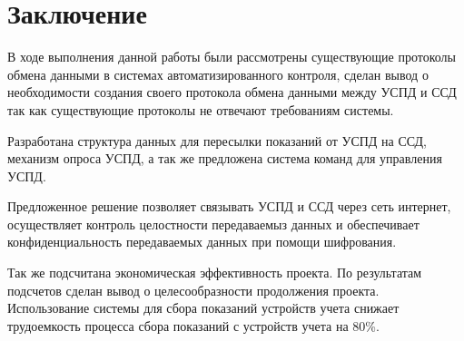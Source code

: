 \newpage
\section{Заключение}
\setcounter{figure}{0}

В ходе выполнения данной работы были рассмотрены существующие протоколы обмена данными в системах автоматизированного контроля, сделан вывод о необходимости создания своего протокола обмена данными между УСПД и ССД так как существующие протоколы не отвечают требованиям системы. 

Разработана структура данных для пересылки показаний от УСПД на ССД, механизм опроса УСПД, а так же предложена система команд для управления УСПД.


Предложенное решение позволяет связывать УСПД и ССД через сеть интернет, осуществляет контроль целостности передаваемыз данных и обеспечивает конфиденциальность передаваемых данных при помощи шифрования.

Так же подсчитана экономическая эффективность проекта. По результатам подсчетов сделан вывод о целесообразности продолжения проекта. Использование системы для сбора показаний устройств учета снижает трудоемкость процесса сбора показаний с устройств учета на 80\%.